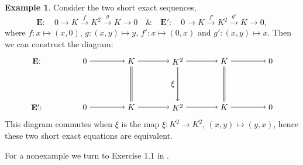 \documentclass[11.5pt, twoside, a4paper, titlepage]{report}
\theoremstyle{definition}
\newtheorem{eg}[mydef]{Example}
\theoremstyle{plain}
\begin{document}
\begin{eg}
Consider the two short exact sequences, 
\begin{equation*}
\mathbf{E}: \quad 0\xrightarrow{}K\xrightarrow{f}K^2\xrightarrow{g}K\xrightarrow{}0  \quad \& \quad \mathbf{E'}: \quad 0\xrightarrow{}K\xrightarrow{f'}K^2\xrightarrow{g'}K\xrightarrow{}0 ,
\end{equation*}
where $f: x \mapsto (x, 0)$, $g: (x,y)\mapsto y$, $f':x \mapsto (0,x)$ and $g':(x,y)\mapsto x$. Then we can construct the diagram: 
\begin{equation*}
\begin{tikzpicture}[->,-latex, auto, main path/.style={->, semithick}, main node/.style={}]
\node	[main node]		(1) at (0,0)		{$\mathbf{E}$: \quad };
\node	[main node]		(2) at (2,0)		{$0$};
\node	[main node]		(3) at (4,0)		{$K$};
\node [main node]		(4) at (6,0)		{$K^2$};
\node [main node]		(5) at (8,0)		{$K$};
\node	[main node]		(11) at (10,0)	{$0$};

\node	[main node]		(6) at (0,-2)		{$\mathbf{E'}$: \quad};
\node	[main node]		(7) at (2,-2)		{$0$};
\node	[main node]		(8) at (4,-2)		{$K$};
\node [main node]		(9) at (6,-2)		{$K^2$};
\node [main node]		(10) at (8,-2)	{$K$};
\node [main node]		(13) at (10,-2)	{$0$};



\draw (2) edge [main path] node [auto] {$$} (3);
\draw (3) edge [main path] node [auto] {$$} (4);
\draw (4) edge [main path] node [auto] {$$} (5);
\draw (5) edge [main path] (11);


\draw (7) edge [main path] node [auto] {$$} (8);
\draw (8) edge [main path] node [auto] {$$} (9);
\draw (9) edge [main path] node [auto] {$$} (10);
\draw (10) edge [main path] (13);

\draw (3) edge [-, semithick, double, double distance=1.5pt] (8);
\draw (4) edge [main path] node [auto, swap] {$\xi$} (9);
\draw (5) edge [-, semithick, double, double distance=1.5pt](10);
\end{tikzpicture}
\end{equation*}
This diagram commutes when $\xi$ is the map $\xi: K^2 \to K^2$, $(x, y) \mapsto (y, x)$, hence these two short exact equations are equivalent.
\end{eg}

For a nonexample we turn to Exercise \uppercase\expandafter{} 1.1 in \cite{Stamm}.
\end{document}
